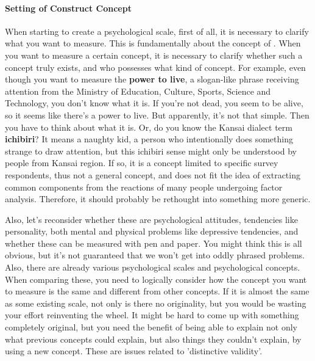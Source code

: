 \documentclass{ltjsbook}
\begin{document}
\paragraph{Setting of Construct Concept} When starting to create a psychological scale, first of all, it is necessary to clarify what you want to measure. This is fundamentally about the concept of . When you want to measure a certain concept, it is necessary to clarify whether such a concept truly exists, and who possesses what kind of concept. For example, even though you want to measure the \textbf{power to live}, a slogan-like phrase receiving attention from the Ministry of Education, Culture, Sports, Science and Technology, you don't know what it is. If you're not dead, you seem to be alive, so it seems like there's a power to live. But apparently, it's not that simple. Then you have to think about what it is. Or, do you know the Kansai dialect term \textbf{ichibiri}? It means a naughty kid, a person who intentionally does something strange to draw attention, but this ichibiri sense might only be understood by people from Kansai region. If so, it is a concept limited to specific survey respondents, thus not a general concept, and does not fit the idea of extracting common components from the reactions of many people undergoing factor analysis. Therefore, it should probably be rethought into something more generic.


Also, let's reconsider whether these are psychological attitudes, tendencies like personality, both mental and physical problems like depressive tendencies, and whether these can be measured with pen and paper. You might think this is all obvious, but it's not guaranteed that we won't get into oddly phrased problems. Also, there are already various psychological scales and psychological concepts. When comparing these, you need to logically consider how the concept you want to measure is the same and different from other concepts. If it is almost the same as some existing scale, not only is there no originality, but you would be wasting your effort reinventing the wheel. It might be hard to come up with something completely original, but you need the benefit of being able to explain not only what previous concepts could explain, but also things they couldn't explain, by using a new concept. These are issues related to 'distinctive validity'.
\end{document}
